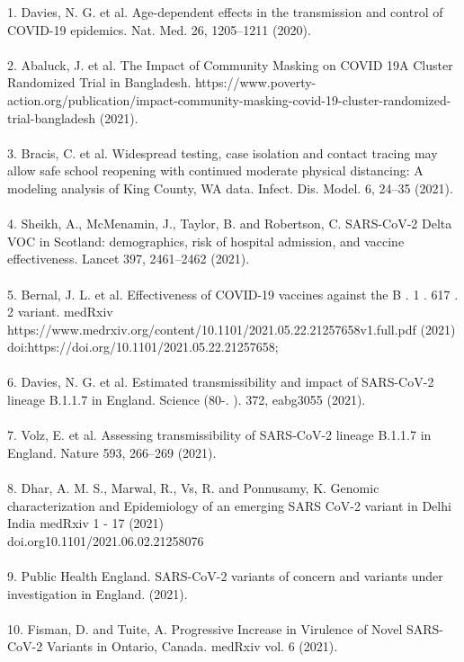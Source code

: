 \documentclass[11pt]{article}
\begin{document}
1. {Davies, N. G. et al. Age-dependent effects in the transmission and control of COVID-19 epidemics. Nat. Med. 26, 1205–1211 (2020).}\\
\\
2. {Abaluck, J. et al. The Impact of Community Masking on COVID 19A Cluster Randomized Trial in Bangladesh. https://www.poverty-action.org/publication/impact-community-masking-covid-19-cluster-randomized-trial-bangladesh (2021).} \\
\\
3. {Bracis, C. et al. Widespread testing, case isolation and contact tracing may allow safe school reopening with continued moderate physical distancing: A modeling analysis of King County, WA data. Infect. Dis. Model. 6, 24–35 (2021).}\\
\\
4. {Sheikh, A., McMenamin, J., Taylor, B. and Robertson, C. SARS-CoV-2 Delta VOC in Scotland: demographics, risk of hospital admission, and vaccine effectiveness. Lancet 397, 2461–2462 (2021).}\\
\\
5. {Bernal, J. L. et al. Effectiveness of COVID-19 vaccines against the B . 1 . 617 . 2 variant. medRxiv https://www.medrxiv.org/content/10.1101/2021.05.22.21257658v1.full.pdf (2021) \\
doi:https://doi.org/10.1101/2021.05.22.21257658;}\\ 
\\
6. {Davies, N. G. et al. Estimated transmissibility and impact of SARS-CoV-2 lineage B.1.1.7 in England. Science (80-. ). 372, eabg3055 (2021). }\\
\\
7. {Volz, E. et al. Assessing transmissibility of SARS-CoV-2 lineage B.1.1.7 in England. Nature 593, 266–269 (2021).} \\
\\
8. {Dhar, A. M. S., Marwal, R., Vs, R. and Ponnusamy, K. Genomic characterization and Epidemiology of an emerging SARS CoV-2 variant in Delhi India medRxiv 1 - 17 (2021) \\
doi.org10.1101/2021.06.02.21258076}\\
\\
9. {Public Health England. SARS-CoV-2 variants of concern and variants under investigation in England. (2021). }\\
\\
10. {Fisman, D. and Tuite, A. Progressive Increase in Virulence of Novel SARS-CoV-2 Variants in Ontario, Canada. medRxiv vol. 6 (2021).}\\
\end{document}
